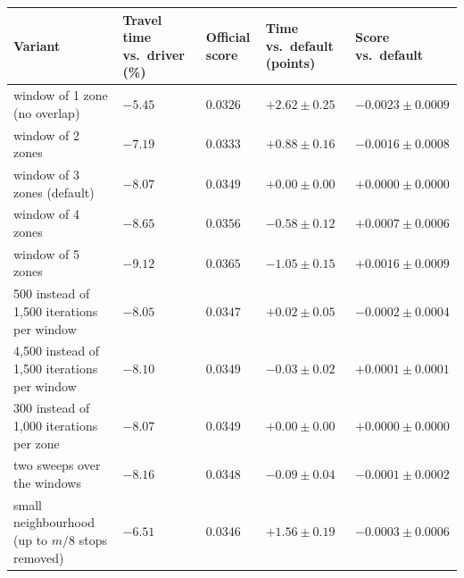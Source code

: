 \begin{tabular}{p{4.9cm}R{2.3cm}R{1.9cm}R{2.5cm}R{2.5cm}}
\toprule
Variant & Travel time vs.\ driver (\%) & Official score & Time vs.\ default (points) & Score vs.\ default \\
\midrule
window of 1 zone (no overlap) & $-5.45$ & $0.0326$ & $+2.62\pm0.25$ & $-0.0023\pm0.0009$ \\
window of 2 zones & $-7.19$ & $0.0333$ & $+0.88\pm0.16$ & $-0.0016\pm0.0008$ \\
window of 3 zones (default) & $-8.07$ & $0.0349$ & $+0.00\pm0.00$ & $+0.0000\pm0.0000$ \\
window of 4 zones & $-8.65$ & $0.0356$ & $-0.58\pm0.12$ & $+0.0007\pm0.0006$ \\
window of 5 zones & $-9.12$ & $0.0365$ & $-1.05\pm0.15$ & $+0.0016\pm0.0009$ \\
500 instead of 1,500 iterations per window & $-8.05$ & $0.0347$ & $+0.02\pm0.05$ & $-0.0002\pm0.0004$ \\
4,500 instead of 1,500 iterations per window & $-8.10$ & $0.0349$ & $-0.03\pm0.02$ & $+0.0001\pm0.0001$ \\
300 instead of 1,000 iterations per zone & $-8.07$ & $0.0349$ & $+0.00\pm0.00$ & $+0.0000\pm0.0000$ \\
two sweeps over the windows & $-8.16$ & $0.0348$ & $-0.09\pm0.04$ & $-0.0001\pm0.0002$ \\
small neighbourhood (up to $m/8$ stops removed) & $-6.51$ & $0.0346$ & $+1.56\pm0.19$ & $-0.0003\pm0.0006$ \\
\bottomrule
\end{tabular}
